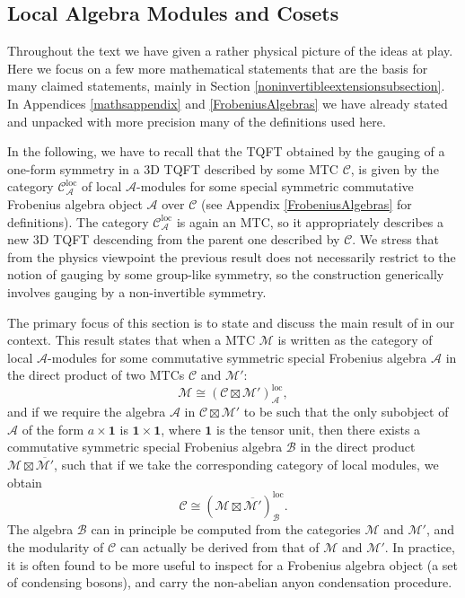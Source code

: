 \documentclass[11pt]{article}
\numberwithin{equation}{section}
\begin{document}
\subsection{Local Algebra Modules and Cosets}  \label{LocalAlgebraModulesandCosets}


Throughout the text we have given a rather physical picture of the ideas at play. Here we focus on a few more mathematical statements that are the basis for many claimed statements, mainly in Section \ref{noninvertibleextensionsubsection}. In Appendices \ref{mathsappendix} and \ref{FrobeniusAlgebras} we have already stated and unpacked with more precision many of the definitions used here.

In the following, we have to recall that the TQFT obtained by the gauging of a one-form symmetry in a 3D TQFT described by some MTC $\mathcal{C}$, is given by the category $\mathcal{C}^{\mathrm{loc}}_{\mathcal{A}}$ of local $\mathcal{A}$-modules for some special symmetric commutative Frobenius algebra object $\mathcal{A}$ over $\mathcal{C}$ (see Appendix \ref{FrobeniusAlgebras} for definitions). The category $\mathcal{C}^{\mathrm{loc}}_{\mathcal{A}}$ is again an MTC, so it appropriately describes a new 3D TQFT descending from the parent one described by $\mathcal{C}$. We stress that from the physics viewpoint the previous result does not necessarily restrict to the notion of gauging by some group-like symmetry, so the construction generically involves gauging by a non-invertible symmetry.



The primary focus of this section is to state and discuss the main result of \cite{Frohlich:2003hm} in our context. This result states that when a MTC $\mathcal{M}$ is written as the category of local $\mathcal{A}$-modules for some commutative symmetric special Frobenius algebra $\mathcal{A}$ in the direct product of two MTCs $\mathcal{C}$ and $\mathcal{M}'$:
\begin{equation} \label{originalcosetstatement}
    \mathcal{M} \cong (\mathcal{C} \boxtimes \mathcal{M}')^{\mathrm{loc}}_{\mathcal{A}},
\end{equation}
and if we require the algebra $\mathcal{A}$ in $\mathcal{C} \boxtimes \mathcal{M}'$ to be such that the only subobject of $\mathcal{A}$ of the form $a \times \mathbf{1}$ is $\mathbf{1} \times \mathbf{1}$, where $\mathbf{1}$ is the tensor unit, then there exists a commutative symmetric special Frobenius algebra $\mathcal{B}$ in the direct product $\mathcal{M} \boxtimes \overline{\mathcal{M}'}$, such that if we take the corresponding category of local modules, we obtain
\begin{equation} \label{cosetisolation}
    \mathcal{C} \cong (\mathcal{M} \boxtimes \overline{\mathcal{M}'})^{\mathrm{loc}}_{\mathcal{B}}.
\end{equation}
The algebra $\mathcal{B}$ can in principle be computed from the categories $\mathcal{M}$ and $\mathcal{M'}$, and the modularity of $\mathcal{C}$ can actually be derived from that of $\mathcal{M}$ and $\mathcal{M}'$. In practice, it is often found to be more useful to inspect for a Frobenius algebra object (a set of condensing bosons), and carry the non-abelian anyon condensation procedure.
\end{document}

